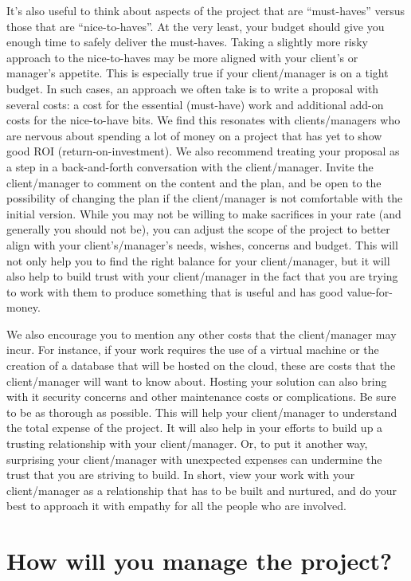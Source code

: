 \documentclass[
]{book}
\begin{document}
It's also useful to think about aspects of the project that are ``must-haves'' versus those that are ``nice-to-haves''. At the very least, your budget should give you enough time to safely deliver the must-haves. Taking a slightly more risky approach to the nice-to-haves may be more aligned with your client's or manager's appetite. This is especially true if your client/manager is on a tight budget. In such cases, an approach we often take is to write a proposal with several costs: a cost for the essential (must-have) work and additional add-on costs for the nice-to-have bits. We find this resonates with clients/managers who are nervous about spending a lot of money on a project that has yet to show good ROI (return-on-investment). We also recommend treating your proposal as a step in a back-and-forth conversation with the client/manager. Invite the client/manager to comment on the content and the plan, and be open to the possibility of changing the plan if the client/manager is not comfortable with the initial version. While you may not be willing to make sacrifices in your rate (and generally you should not be), you can adjust the scope of the project to better align with your client's/manager's needs, wishes, concerns and budget. This will not only help you to find the right balance for your client/manager, but it will also help to build trust with your client/manager in the fact that you are trying to work with them to produce something that is useful and has good value-for-money.

We also encourage you to mention any other costs that the client/manager may incur. For instance, if your work requires the use of a virtual machine or the creation of a database that will be hosted on the cloud, these are costs that the client/manager will want to know about. Hosting your solution can also bring with it security concerns and other maintenance costs or complications. Be sure to be as thorough as possible. This will help your client/manager to understand the total expense of the project. It will also help in your efforts to build up a trusting relationship with your client/manager. Or, to put it another way, surprising your client/manager with unexpected expenses can undermine the trust that you are striving to build. In short, view your work with your client/manager as a relationship that has to be built and nurtured, and do your best to approach it with empathy for all the people who are involved.

\hypertarget{how-will-you-manage-the-project}{%
\section{How will you manage the project?}\label{how-will-you-manage-the-project}}
\end{document}
